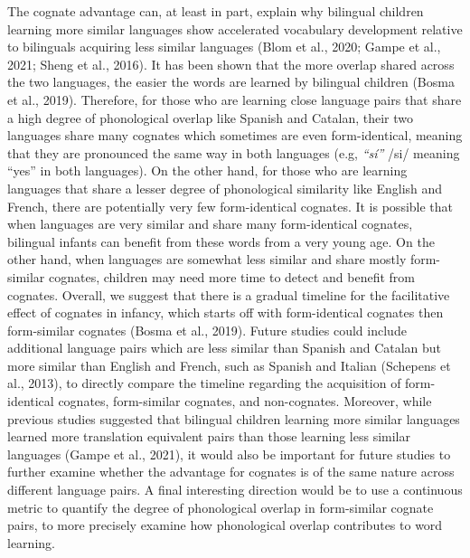 \documentclass[
  ,man,floatsintext]{apa6}
\begin{document}
The cognate advantage can, at least in part, explain why bilingual children learning more similar languages show accelerated vocabulary development relative to bilinguals acquiring less similar languages (Blom et al., 2020; Gampe et al., 2021; Sheng et al., 2016). It has been shown that the more overlap shared across the two languages, the easier the words are learned by bilingual children (Bosma et al., 2019). Therefore, for those who are learning close language pairs that share a high degree of phonological overlap like Spanish and Catalan, their two languages share many cognates which sometimes are even form-identical, meaning that they are pronounced the same way in both languages (e.g, \emph{``sí''} /si/ meaning ``yes'' in both languages). On the other hand, for those who are learning languages that share a lesser degree of phonological similarity like English and French, there are potentially very few form-identical cognates. It is possible that when languages are very similar and share many form-identical cognates, bilingual infants can benefit from these words from a very young age. On the other hand, when languages are somewhat less similar and share mostly form-similar cognates, children may need more time to detect and benefit from cognates. Overall, we suggest that there is a gradual timeline for the facilitative effect of cognates in infancy, which starts off with form-identical cognates then form-similar cognates (Bosma et al., 2019). Future studies could include additional language pairs which are less similar than Spanish and Catalan but more similar than English and French, such as Spanish and Italian (Schepens et al., 2013), to directly compare the timeline regarding the acquisition of form-identical cognates, form-similar cognates, and non-cognates. Moreover, while previous studies suggested that bilingual children learning more similar languages learned more translation equivalent pairs than those learning less similar languages (Gampe et al., 2021), it would also be important for future studies to further examine whether the advantage for cognates is of the same nature across different language pairs. A final interesting direction would be to use a continuous metric to quantify the degree of phonological overlap in form-similar cognate pairs, to more precisely examine how phonological overlap contributes to word learning.
\end{document}
